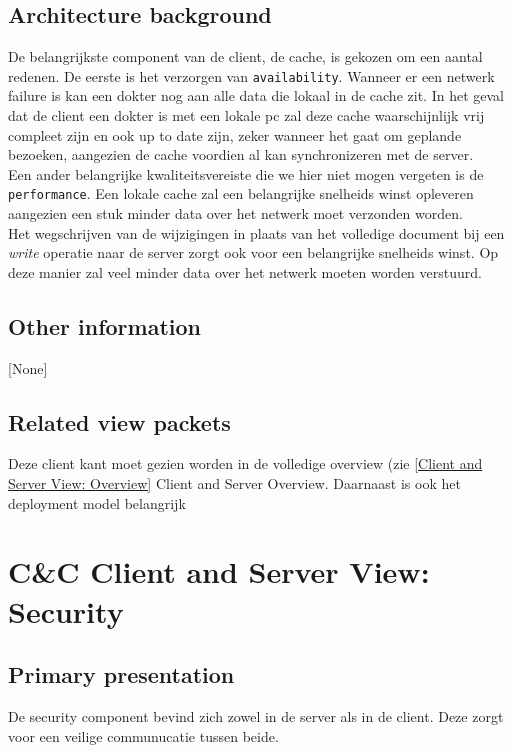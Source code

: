 \documentclass[a4paper,10pt]{book}
\begin{document}
\subsection{Architecture background}
De belangrijkste component van de client, de cache, is gekozen om een aantal redenen.  De eerste is het verzorgen van \texttt{availability}.  Wanneer er een netwerk failure is kan een dokter nog aan alle data die lokaal in de cache zit.  In het geval dat de client een dokter is met een lokale pc zal deze cache waarschijnlijk vrij compleet zijn en ook up to date zijn, zeker wanneer het gaat om geplande bezoeken, aangezien de cache voordien al kan synchronizeren met de server.\\
Een ander belangrijke kwaliteitsvereiste die we hier niet mogen vergeten is de \texttt{performance}.  Een lokale cache zal een belangrijke snelheids winst opleveren aangezien een stuk minder data over het netwerk moet verzonden worden.\\
Het wegschrijven van de wijzigingen in plaats van het volledige document bij een \textit{write} operatie naar de server zorgt ook voor een belangrijke snelheids winst.  Op deze manier zal veel minder data over het netwerk moeten worden verstuurd.

\subsection{Other information}
[None]

\subsection{Related view packets}
Deze client kant moet gezien worden in de volledige overview (zie \ref{Client and Server View: Overview} Client and Server Overview.  Daarnaast is ook het deployment model belangrijk


\section{C\&C Client and Server View: Security}
\label{Client and Server View: Security}

\subsection{Primary presentation}
De security component bevind zich zowel in de server als in de client. Deze zorgt voor een veilige communucatie tussen beide.
\end{document}
